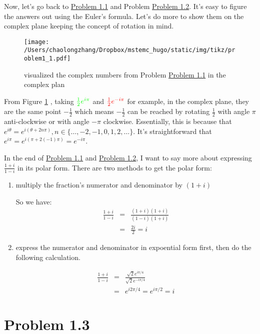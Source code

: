 \documentclass[koma,a4paper,utopia,12pt,listings-color,microtype,paralist,colorlinks,urlcolor=red]{org-article}
\begin{document}
Now, let's go back to \hyperref[prob11]{Problem 1.1} and Problem \hyperref[prob12]{Problem
1.2}. It's easy to figure the answers out using the Euler's formula. Let's do
more to show them on the complex plane keeping the concept of rotation in mind.

\begin{figure}[htbp]
\centering
\texttt{[image: /Users/chaolongzhang/Dropbox/mstemc\_hugo/static/img/tikz/problem1\_1.pdf]}
\caption{\label{problem1-1}visualized the complex numbers from Problem \hyperref[prob11]{Problem 1.1} in the complex plan}
\end{figure}

From Figure \ref{problem1-1} , taking \(\color{green}{\tfrac{1}{2}e^{i\pi}}\) and
\(\color{red}{\tfrac{1}{2}e^{-i\pi}}\) for example, in the complex plane, they
are the same point \(-\tfrac{1}{2}\) which means \(-\tfrac{1}{2}\) can be
reached by rotating \(\tfrac{1}{2}\) with angle \(\pi\) anti-clockwise or with angle
\(-\pi\) clockwise. Essentially, this is because that \(e^{i\theta} =
 e^{i(\theta + 2n\pi)}, n\in \{\ldots,-2,-1,0,1,2,\ldots\}\). It's
straightforward that \(e^{i\pi} = e^{i(\pi + 2(-1)\pi)} = e^{-i\pi}\).

In the end of \hyperref[prob11]{Problem 1.1} and \hyperref[prob12]{Problem 1.2}, I want to say
more about expressing \(\tfrac{1+i}{1-i}\) in its polar form. There are two
methods to get the polar form:
\begin{enumerate}
\item multiply the fraction's numerator and denominator by \(( 1 + i )\)

So we have:
\begin{eqnarray*}
\frac{1+i}{1-i}& = & \frac{(1+i)(1+i)}{(1-i)(1+i)} \\
&=& \frac{2i}{2} = i
\end{eqnarray*}

\item express the numerator and denominator in expoential form first, then do the
following calculation.

\begin{eqnarray*}
\frac{1+i}{1-i} &=& \frac{\sqrt{2}e^{i\pi/4}}{\sqrt{2}e^{-i\pi/4}}  \\
&=& e^{i2\pi/4} = e^{i\pi/2} = i
\end{eqnarray*}
\end{enumerate}
\section{Problem 1.3}
\label{sec:org975ac37}
\end{document}
